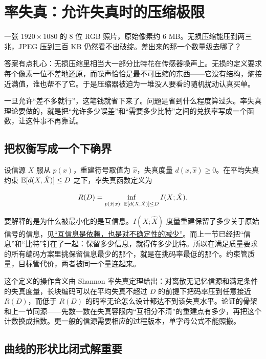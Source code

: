 \section{率失真：允许失真时的压缩极限}
\label{sec:07-Information-Theory/04-Source-Coding/05}

一张 \(1920\times1080\) 的 8 位 RGB 照片，原始像素约 6 MB。无损压缩能压到两三兆，JPEG 压到三百 KB 仍然看不出破绽。差出来的那一个数量级去哪了？

答案有点扎心：无损压缩里相当大一部分比特花在传感器噪声上。无损的定义要求每个像素一位不差地还原，而噪声恰恰是最不可压缩的东西——它没有结构，熵接近满值，谁也帮不了它。于是压缩器被迫为一堆没人要看的随机扰动认真买单。

一旦允许``差不多就行''，这笔钱就省下来了。问题是省到什么程度算过头。率失真理论要做的，就是把``允许多少误差''和``需要多少比特''之间的兑换率写成一个函数，让这件事不再靠试。

\subsection{把权衡写成一个下确界}

\begin{definition}
设信源 \(X\) 服从 \(p(x)\)，重建符号取值为 \(\hat x\)，失真度量 \(d(x,\hat x)\ge0\)。在平均失真约束 \(\mathbb{E}[d(X,\hat X)]\le D\) 之下，率失真函数定义为

\[
R(D)=\inf_{p(\hat x\given x):\ \E[d(X,\hat X)]\le D} I(X;\hat X).
\]
\end{definition}

要解释的是为什么被最小化的是互信息。\(I(X;\hat X)\) 度量重建保留了多少关于原始信号的信息，见\hyperref[sec:07-Information-Theory/02-Joint-Information/02]{``互信息是依赖，也是对不确定性的减少''}。而上一节已经把``信息''和``比特''钉在了一起：保留多少信息，就得传多少比特。所以在满足质量要求的所有编码方案里挑保留信息最少的那个，就是在挑码率最低的那个。约束管质量，目标管代价，两者被同一个量连起来。

这个定义的操作含义由 Shannon 率失真定理给出：对离散无记忆信源和满足条件的失真度量，长块编码可以在平均失真不超过 \(D\) 的前提下把码率压到任意接近 \(R(D)\)，而低于 \(R(D)\) 的码率无论怎么设计都达不到该失真水平。论证的骨架和上一节同源——先数一数在失真容限内``互相分不清''的重建点有多少，再把这个计数换成指数。更一般的信源需要相应的过程版本，单字母公式不能照搬。

\subsection{曲线的形状比闭式解重要}

